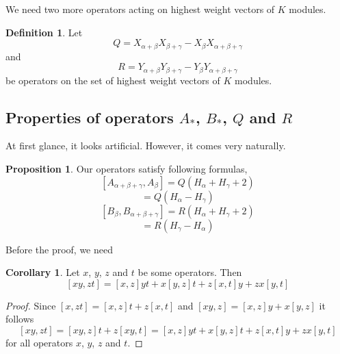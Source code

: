 \documentclass[twoside,a4paper,12pt]{article}
\theoremstyle{definition}
\newtheorem{definition}{Definition}
\newtheorem{proposition}{Proposition}
\newtheorem{corollary}{Corollary}
\begin{document}
We need two more operators acting on highest weight vectors of $K$ modules.

\begin{definition}
	Let
	\begin{equation*}
		Q=X_{\alpha+\beta}X_{\beta+\gamma}-X_\beta X_{\alpha+\beta+\gamma}
	\end{equation*}
	and
	\begin{equation*}
		R=Y_{\alpha+\beta}Y_{\beta+\gamma}-Y_\beta Y_{\alpha+\beta+\gamma}
	\end{equation*}
	be operators on the set of highest weight vectors of $K$ modules.
\end{definition}



\subsection{\texorpdfstring{Properties of operators $A_*$, $B_*$, $Q$ and $R$}
	{Properties of operators A, B, Q and R}}

At first glance, it looks artificial. However, it comes very naturally.

\begin{proposition}\label{commab}
	Our operators satisfy following formulas,
	\begin{equation}\label{comma}
		[A_{\alpha+\beta+\gamma},A_\beta]=Q(H_\alpha+H_\gamma+2)
	\end{equation}
	\begin{equation*}
		[A_{\alpha+\beta},A_{\beta+\gamma}]=Q(H_\alpha-H_\gamma)
	\end{equation*}
	\begin{equation}\label{commb}
		[B_\beta,B_{\alpha+\beta+\gamma}]=R(H_\alpha+H_\gamma+2)
	\end{equation}
	\begin{equation*}
		[B_{\alpha+\beta},B_{\beta+\gamma}]=R(H_\gamma-H_\alpha)
	\end{equation*}
\end{proposition}

Before the proof, we need

\begin{corollary}\label{corcomm}
	Let $x$, $y$, $z$ and $t$ be some operators. Then
	\begin{equation}\label{comm}
		[xy,zt]=[x,z]yt+x[y,z]t+z[x,t]y+zx[y,t]
	\end{equation}
\end{corollary}

\begin{proof}
	Since $[x,zt]=[x,z]t+z[x,t]$ and $[xy,z]=[x,z]y+x[y,z]$ it follows
	\[ [xy,zt]=[xy,z]t+z[xy,t]=[x,z]yt+x[y,z]t+z[x,t]y+zx[y,t] \]
	for all operators $x$, $y$, $z$ and $t$.
\end{proof}
\end{document}
